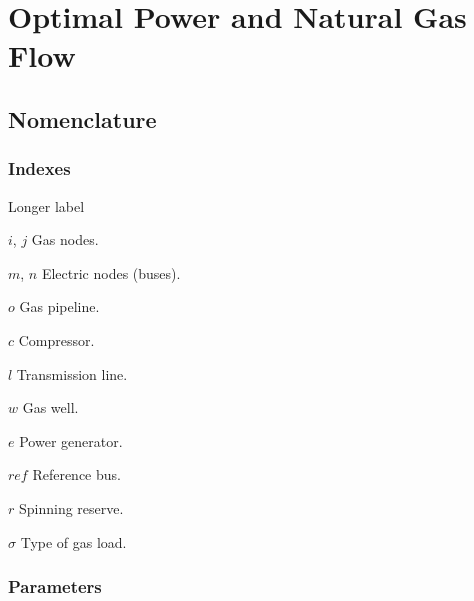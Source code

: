\chapter{Optimal Power and Natural Gas Flow}
\label{chap:formulation}

\section*{Nomenclature}
\subsection*{Indexes}
\begin{labeling}{Longer label\quad}
\item [$i$, $j$] Gas nodes.
\item [$m$, $n$] Electric nodes (buses). 
\item [$o$] Gas pipeline.
\item [$c$] Compressor.
\item [$l$] Transmission line.
\item [$w$] Gas well.
\item [$e$] Power generator.
\item [$ref$] Reference bus.
\item [$r$] Spinning reserve.
\item [$\sigma$] Type of gas load.
\end{labeling}

\subsection*{Parameters}

